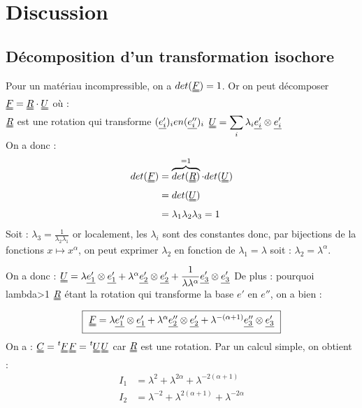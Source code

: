 \documentclass[a4paper,11pt]{article}
\newcommand{\trans}[1]{\tensor[^t]{#1}{}}
\newcommand{\SUM}{\displaystyle\sum}
\newcommand{\FRAC}{\displaystyle\frac}
\newcommand{\tens}{\uuline}
\begin{document}
\section{Discussion}
\subsection{Décomposition d'un transformation isochore}
Pour un matériau incompressible, on a $det(\tens{F}) = 1$.
Or on peut décomposer $\tens{F} = \tens{R}\cdot \tens{U}$ où :\\
$\tens{R}$ est une rotation qui transforme $(\uline{e'_i})_i en (\uline{e''_i})_i$
$\tens{U} = \SUM_i \lambda_i \uline{e'_i} \otimes \uline{e'_i}$
\\
On a donc :
\begin{align*}
det(\tens{F}) &= \overbrace{det(\tens{R})}^{=1} \cdot det(\tens{U}) \\
&= det(\tens{U}) \\
&= \lambda_1 \lambda_2 \lambda_3 = 1\\
\end{align*}
Soit : $\lambda_3 = \FRAC{1}{\lambda_2 \lambda_1}$ or localement, les $\lambda_i$ sont des constantes donc, par bijections de la fonctions $x \mapsto x^\alpha$, on peut exprimer $\lambda_2$ en fonction de $\lambda_1 = \lambda$ soit : $\lambda_2 = \lambda^\alpha$.

On a donc : $\tens{U} = \lambda \uline{e'_1} \otimes \uline{e'_1} + \lambda^\alpha \uline{e'_2} \otimes \uline{e'_2} + \FRAC{1}{\lambda \lambda^\alpha} \uline{e'_3} \otimes \uline{e'_3}$
De plus : pourquoi lambda>1
$\tens{R}$ étant la rotation qui transforme la base $e'$ en $e''$, on a bien :
\begin{equation}
\fbox{
$
\tens{F} = \lambda \uline{e''_1} \otimes \uline{e'_1} + \lambda^\alpha \uline{e''_2} \otimes \uline{e'_2} + \lambda^{-(\alpha +1)} \uline{e''_3} \otimes \uline{e'_3}
$
}
\end{equation}
On a : $\tens{C} = \trans{\tens{F}} \tens{F} = \trans{\tens{U}} \tens{U}$ car $\tens{R}$ est une rotation.
Par un calcul simple, on obtient :
\begin{align*}
I_1 &= \lambda^2 + \lambda^{2 \alpha} + \lambda^{- 2 (\alpha +1)} \\
I_2 &= \lambda^{-2} + \lambda^{2 (\alpha+1)} + \lambda^{ -2 \alpha} \\
\end{align*}
\end{document}
